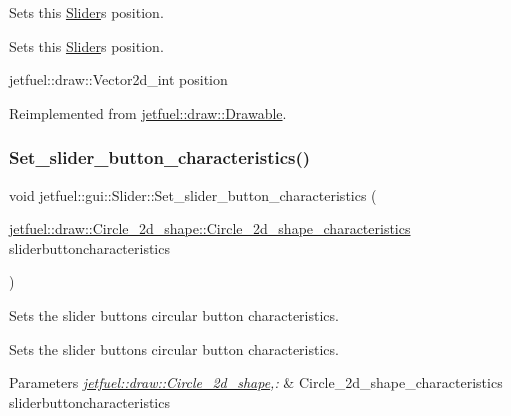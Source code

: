 Sets this \hyperlink{classjetfuel_1_1gui_1_1Slider}{Slider}\textquotesingle{}s position. 

Sets this \hyperlink{classjetfuel_1_1gui_1_1Slider}{Slider}\textquotesingle{}s position.

jetfuel\+::draw\+::\+Vector2d\+\_\+int position 

Reimplemented from \hyperlink{classjetfuel_1_1draw_1_1Drawable_afdd035afe40c706459a6c9df813bcce6}{jetfuel\+::draw\+::\+Drawable}.

\mbox{\label{classjetfuel_1_1gui_1_1Slider_a1d83644e298afe4153c00203ab493397}} 
\subsubsection{\texorpdfstring{Set\+\_\+slider\+\_\+button\+\_\+characteristics()}{Set\_slider\_button\_characteristics()}}
{\footnotesize\ttfamily void jetfuel\+::gui\+::\+Slider\+::\+Set\+\_\+slider\+\_\+button\+\_\+characteristics (\begin{DoxyParamCaption}\item[{\hyperlink{structjetfuel_1_1draw_1_1Circle__2d__shape_1_1Circle__2d__shape__characteristics}{jetfuel\+::draw\+::\+Circle\+\_\+2d\+\_\+shape\+::\+Circle\+\_\+2d\+\_\+shape\+\_\+characteristics}}]{sliderbuttoncharacteristics }\end{DoxyParamCaption})\hspace{0.3cm}{\ttfamily [inline]}}



Sets the slider button\textquotesingle{}s circular button characteristics. 

Sets the slider button\textquotesingle{}s circular button characteristics.


\begin{DoxyParams}{Parameters}
{\em \hyperlink{classjetfuel_1_1draw_1_1Circle__2d__shape}{jetfuel\+::draw\+::\+Circle\+\_\+2d\+\_\+shape},\+:} & Circle\+\_\+2d\+\_\+shape\+\_\+characteristics sliderbuttoncharacteristics \\
\hline
\end{DoxyParams}
\mbox{\label{classjetfuel_1_1gui_1_1Slider_ae0b83862beb7f631145fd3c9dddfb661}} 

